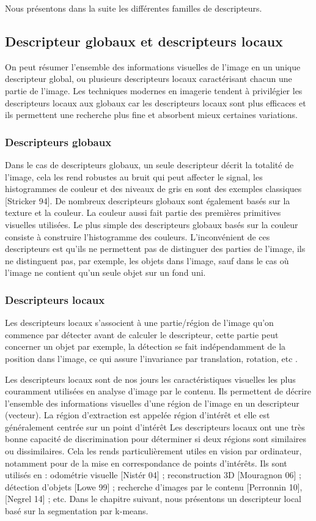 Nous présentons dans la suite les différentes familles de descripteurs.


\subsection{Descripteur globaux et descripteurs locaux}
On peut résumer l’ensemble des informations visuelles de l’image en un unique descripteur
global, ou plusieurs descripteurs locaux caractérisant chacun une partie de l’image. Les
techniques modernes en imagerie tendent à privilégier les descripteurs locaux aux globaux car
les descripteurs locaux sont plus efficaces et ils permettent une recherche plus fine et
absorbent mieux certaines variations.

\subsubsection{Descripteurs globaux}
Dans le cas de descripteurs globaux, un seule descripteur décrit la totalité de l’image, cela
les rend robustes au bruit qui peut affecter le signal, les histogrammes de couleur et des
niveaux de gris en sont des exemples classiques [Stricker 94]. De nombreux descripteurs
globaux sont également basés sur la texture et la couleur. La couleur aussi fait partie des
premières primitives visuelles utilisées. Le plus simple des descripteurs globaux basés sur la
couleur consiste à construire l’histogramme des couleurs.
L’inconvénient de ces descripteurs est qu’ils ne permettent pas de distinguer des parties de
l’image, ils ne distinguent pas, par exemple, les objets dans l’image, sauf dans le cas où
l’image ne contient qu’un seule objet sur un fond uni.

\subsubsection{Descripteurs locaux}
Les descripteurs locaux s’associent à une partie/région de l’image qu’on commence par
détecter avant de calculer le descripteur, cette partie peut concerner un objet par exemple, la
détection se fait indépendamment de la position dans l’image, ce qui assure l’invariance par
translation, rotation, etc .

Les descripteurs locaux sont de nos jours les caractéristiques visuelles les plus couramment
utilisées en analyse d’image par le contenu. Ils permettent de décrire l’ensemble des
informations visuelles d’une région de l’image en un descripteur (vecteur). La région
d’extraction est appelée région d’intérêt et elle est généralement centrée sur un point d’intérêt
Les descripteurs locaux ont une très bonne capacité de discrimination pour déterminer si
deux régions sont similaires ou dissimilaires. Cela les rends particulièrement utiles en vision
par ordinateur, notamment pour de la mise en correspondance de points d’intérêts. Ils sont
utilisés en : odométrie visuelle [Nistér 04] ; reconstruction 3D [Mouragnon 06] ; détection
d’objets [Lowe 99] ; recherche d’images par le contenu [Perronnin 10], [Negrel 14] ; etc.
Dans le chapitre suivant, nous présentons un descripteur local basé sur la segmentation par
k-means.

